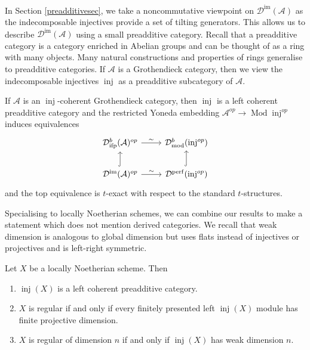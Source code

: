 \documentclass[12pt,oneside]{amsart}
\DeclareMathOperator{\Mod}{Mod}
\DeclareMathOperator{\fdmod}{mod}
\DeclareMathOperator{\perf}{perf}
\DeclareMathOperator{\inj}{inj}
\DeclareMathOperator{\immac}{im}
\DeclareMathOperator{\ifp}{ifp}
\begin{document}
In Section \ref{preadditivesec}, we take a noncommutative viewpoint on $\mathcal{D}^{\immac}(\mathcal{A})$ as the indecomposable injectives provide a set of tilting generators. This allows us to describe $\mathcal{D}^{\immac}(\mathcal{A})$ using a small preadditive category. Recall that a preadditive category is a category enriched in Abelian groups and can be thought of as a ring with many objects. Many natural constructions and properties of rings generalise to preadditive categories. If $\mathcal{A}$ is a Grothendieck category, then we view the indecomposable injectives $\inj$ as a preadditive subcategory of $\mathcal{A}$.

\begin{theorem}
If $\mathcal{A}$ is an $\inj$-coherent Grothendieck category, then $\inj$ is a left coherent preadditive category and the restricted Yoneda embedding $\mathcal{A}^{op} \to \Mod \inj^{op}$ induces equivalences
\[
\begin{tikzcd}
\mathcal{D}^b_{\ifp}(\mathcal{A})^{op} \arrow[r,"\sim"] & \mathcal{D}^b_{\fdmod}(\inj^{op}) \\
\mathcal{D}^{\immac}(\mathcal{A})^{op} \arrow[u,hook] \arrow[r,"\sim"] & \mathcal{D}^{\perf}(\inj^{op}) \arrow[u,hook]
\end{tikzcd}
\]
and the top equivalence is $t$-exact with respect to the standard $t$-structures.
\end{theorem}

Specialising to locally Noetherian schemes, we can combine our results to make a statement which does not mention derived categories. We recall that weak dimension is analogous to global dimension but uses flats instead of injectives or projectives and is left-right symmetric.

\begin{theorem} \label{introweakdimscheme} Let $X$ be a locally Noetherian scheme. Then 
\begin{enumerate}
\item $\inj(X)$ is a left coherent preadditive category.
\item $X$ is regular if and only if every finitely presented left $\inj(X)$ module has finite projective dimension.
\item $X$ is regular of dimension $n$ if and only if $\inj(X)$  has weak dimension $n$.
\end{enumerate}
\end{theorem}
\end{document}
